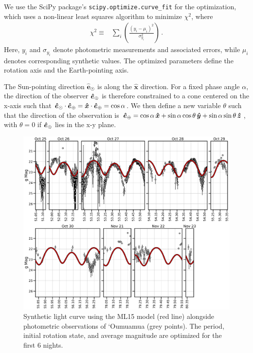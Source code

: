 \documentclass[twocolumn,doublespacing]{aastex631}
\begin{document}
We use the SciPy package's \texttt{scipy.optimize.curve\_fit} for the optimization, which uses a non-linear least squares algorithm to minimize $\chi^2$, where
\begin{equation}
\begin{aligned}
    \chi^2\equiv&\sum_i\left(\frac{(y_i-\mu_i)^2}{\sigma_{y_i}^2}\right)\,.
\end{aligned}
\end{equation}
Here, $y_i$ and $\sigma_{y_i}$ denote photometric measurements and associated errors, while $\mu_i$ denotes corresponding synthetic values. The optimized parameters define the rotation axis and the Earth-pointing axis. 

The Sun-pointing direction $\boldsymbol{\hat{e}}_\Sun$ is along the $\boldsymbol{\hat{x}}$ direction. For a fixed phase angle $\alpha$, the direction of the observer $\boldsymbol{\hat{e}}_\oplus$ is therefore constrained to a cone centered on the x-axis such that $\boldsymbol{\hat{e}}_\odot\cdot\boldsymbol{\hat{e}}_\oplus=\boldsymbol{\hat{x}}\cdot\boldsymbol{\hat{e}}_\oplus=\cos\alpha$. We then define a new variable $\theta$ such that the direction of the observation is $\boldsymbol{\hat{e}}_\oplus=\cos\alpha\,\boldsymbol{\hat{x}}+\sin\alpha\cos\theta\,\boldsymbol{\hat{y}}+\sin\alpha\sin\theta\,\boldsymbol{\hat{z}}$, with $\theta=0$ if $\boldsymbol{\hat{e}}_\oplus$ lies in the x-y plane.

\begin{figure}
\centering
\includegraphics[width=\textwidth,angle=0]{evolving_axis_lightcurve.pdf}
\caption{Synthetic light curve using the ML15 model (red line) alongside photometric observations of `Oumuamua (grey points). The period, initial rotation state, and average magnitude are optimized for the first 6 nights. }
\label{fig:evolvinglightcurve}
\end{figure}
\end{document}
